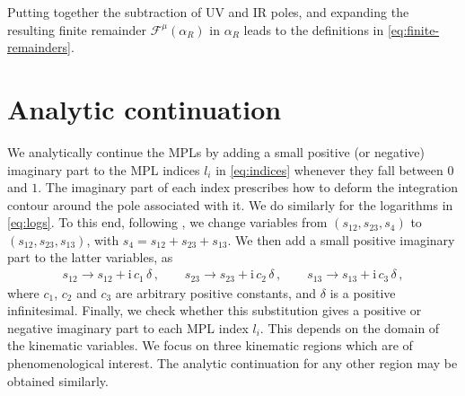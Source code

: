 Putting together the subtraction of \ac{UV} and \ac{IR} poles, and expanding the resulting finite remainder $\mathcal{F}^{\mu}(\alpha_R)$ in $\alpha_R$ leads to the definitions in \cref{eq:finite-remainders}.

\section{Analytic continuation}
\label{app:an_cont}

We analytically continue the \acp{MPL} by adding a small positive (or negative) imaginary part to the \ac{MPL} indices $l_i$ in \cref{eq:indices} whenever they fall between $0$ and $1$. The imaginary part of each index prescribes how to deform the integration contour around the pole associated with it. We do similarly for the logarithms in \cref{eq:logs}.
To this end, following , we change variables from $(s_{12},s_{23},s_4)$ to $(s_{12},s_{23},s_{13})$, with $s_4 = s_{12} + s_{23} + s_{13}$. We then add a small positive imaginary part to the latter variables, as
\begin{align} \label{eq:add_im}
s_{12} \longrightarrow s_{12} + \mathrm{i} \, c_{1} \, \delta \, , \qquad
s_{23} \longrightarrow s_{23} + \mathrm{i} \, c_{2} \, \delta  \, , \qquad
s_{13} \longrightarrow s_{13} + \mathrm{i} \, c_{3} \, \delta  \, , 
\end{align}
where $c_{1}$, $c_{2}$ and $c_{3}$ are arbitrary positive constants, and $\delta$ is a positive infinitesimal. 
Finally, we check whether this substitution gives a positive or negative imaginary part to each \ac{MPL} index $l_i$.
This depends on the domain of the kinematic variables.
We focus on three kinematic regions which are of phenomenological interest. The analytic continuation for any other region may be obtained similarly.

\smallskip

